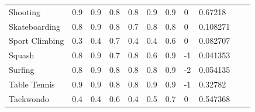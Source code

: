 \documentclass[a4paper]{article}
\begin{document}
\begin{table}[h]
\begin{tabular}{|l|lllllll|l|ll}
    Shooting                                    & \multicolumn{1}{l|}{0.9}      & \multicolumn{1}{l|}{0.9}      & \multicolumn{1}{l|}{0.8}  & \multicolumn{1}{l|}{0.8}  & \multicolumn{1}{l|}{0.9}  & \multicolumn{1}{l|}{0.9}      & 0                       & 0.67218                                                &  &  \\ \cline{1-9}
    Skateboarding                               & \multicolumn{1}{l|}{0.8}      & \multicolumn{1}{l|}{0.9}      & \multicolumn{1}{l|}{0.8}  & \multicolumn{1}{l|}{0.7}  & \multicolumn{1}{l|}{0.8}  & \multicolumn{1}{l|}{0.8}      & 0                       & 0.108271                                               &  &  \\ \cline{1-9}
    Sport Climbing                              & \multicolumn{1}{l|}{0.3}      & \multicolumn{1}{l|}{0.4}      & \multicolumn{1}{l|}{0.7}  & \multicolumn{1}{l|}{0.4}  & \multicolumn{1}{l|}{0.4}  & \multicolumn{1}{l|}{0.6}      & 0                       & 0.082707                                               &  &  \\ \cline{1-9}
    Squash                                      & \multicolumn{1}{l|}{0.8}      & \multicolumn{1}{l|}{0.9}      & \multicolumn{1}{l|}{0.7}  & \multicolumn{1}{l|}{0.8}  & \multicolumn{1}{l|}{0.6}  & \multicolumn{1}{l|}{0.9}      & -1                      & 0.041353                                               &  &  \\ \cline{1-9}
    Surfing                                     & \multicolumn{1}{l|}{0.8}      & \multicolumn{1}{l|}{0.9}      & \multicolumn{1}{l|}{0.8}  & \multicolumn{1}{l|}{0.8}  & \multicolumn{1}{l|}{0.8}  & \multicolumn{1}{l|}{0.9}      & -2                      & 0.054135                                               &  &  \\ \cline{1-9}
    Table Tennis                                & \multicolumn{1}{l|}{0.9}      & \multicolumn{1}{l|}{0.9}      & \multicolumn{1}{l|}{0.8}  & \multicolumn{1}{l|}{0.8}  & \multicolumn{1}{l|}{0.9}  & \multicolumn{1}{l|}{0.9}      & -1                      & 0.32782                                                &  &  \\ \cline{1-9}
    Taekwondo                                   & \multicolumn{1}{l|}{0.4}      & \multicolumn{1}{l|}{0.4}      & \multicolumn{1}{l|}{0.6}  & \multicolumn{1}{l|}{0.4}  & \multicolumn{1}{l|}{0.5}  & \multicolumn{1}{l|}{0.7}      & 0                       & 0.547368                                               &  &  \\ \cline{1-9}

\end{tabular}
\end{table}
\end{document}
